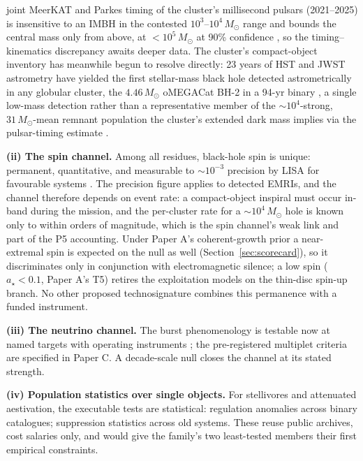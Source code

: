 \documentclass[11pt]{article}
\newcommand{\msun}{\ensuremath{M_\odot}}
\newcommand{\astar}{\ensuremath{a_\star}}
\begin{document}
joint MeerKAT and Parkes timing of the cluster's millisecond pulsars (2021--2025) is insensitive to an IMBH in the contested $10^{3}$--$10^{4}\,\msun$ range and bounds the central mass only from above, at $<10^{5}\,\msun$ at 90\% confidence \citep{ColomiBernadich2026}, so the timing--kinematics discrepancy awaits deeper data. The cluster's compact-object inventory has meanwhile begun to resolve directly: 23 years of HST and JWST astrometry have yielded the first stellar-mass black hole detected astrometrically in any globular cluster, the $4.46\,\msun$ oMEGACat BH-2 in a 94-yr binary \citep{Whitaker2026BH2}, a single low-mass detection rather than a representative member of the $\sim$$10^{4}$-strong, $31\,\msun$-mean remnant population the cluster's extended dark mass implies via the pulsar-timing estimate \citep{BanaresHernandez2025,Swanson2026Engineered}.

\textbf{(ii) The spin channel.} Among all residues, black-hole spin is unique: permanent, quantitative, and measurable to $\sim10^{-3}$ precision by LISA for favourable systems \citep{Babak2017,AmaroSeoane2018,Colpi2024}. The precision figure applies to detected EMRIs, and the channel therefore depends on event rate: a compact-object inspiral must occur in-band during the mission, and the per-cluster rate for a $\sim10^{4}\,\msun$ hole is known only to within orders of magnitude, which is the spin channel's weak link and part of the P5 accounting. Under Paper A's coherent-growth prior a near-extremal spin is expected on the null as well (Section~\ref{sec:scorecard}), so it discriminates only in conjunction with electromagnetic silence; a low spin ($\astar<0.1$, Paper A's T5) retires the exploitation models on the thin-disc spin-up branch. No other proposed technosignature combines this permanence with a funded instrument.

\textbf{(iii) The neutrino channel.} The \citet{Dvali2023} burst phenomenology is testable now at named targets with operating instruments \citep{KM3NeT2025,AntaresIceCube2020}; the pre-registered multiplet criteria are specified in Paper C. A decade-scale null closes the channel at its stated strength.

\textbf{(iv) Population statistics over single objects.} For stellivores and attenuated aestivation, the executable tests are statistical: regulation anomalies across binary catalogues; suppression statistics across old systems. These reuse public archives, cost salaries only, and would give the family's two least-tested members their first empirical constraints.
\end{document}
